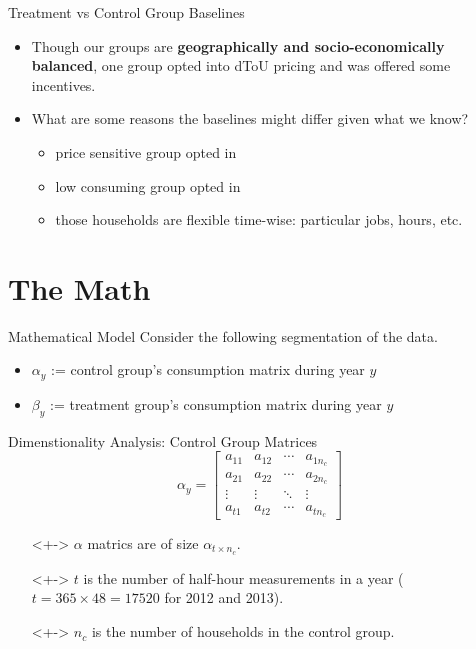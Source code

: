 \documentclass{beamer}
\begin{document}
\begin{frame}{Treatment vs Control Group Baselines}
  \begin{itemize}
    \item<+-> Though our groups are \textbf{geographically and socio-economically balanced}, one group opted into dToU pricing and was offered some incentives.
    \item<+-> What are some reasons the baselines might differ given what we know?
    \begin{itemize}
      \item<+-> price sensitive group opted in
      \item<+-> low consuming group opted in
      \item<+-> those households are flexible time-wise: particular jobs, hours, etc.
    \end{itemize}
  \end{itemize}
\end{frame}

\section{The Math}

\begin{frame}{Mathematical Model}
  Consider the following segmentation of the data.
  \begin{itemize}
    \item $\alpha_y$ := control group's consumption matrix during year $y$
    \item $\beta_y$ := treatment group's consumption matrix during year $y$
  \end{itemize}
\end{frame}

\begin{frame}{Dimenstionality Analysis: Control Group Matrices}
  $$
  \alpha_y = \left[\begin{array}{cccc}
  a_{11} & a_{12} & \cdots & a_{1 n_c} \\
  a_{21} & a_{22} & \cdots & a_{2 n_c} \\
  \vdots & \vdots & \ddots & \vdots \\
  a_{t 1} & a_{t 2} & \cdots & a_{t n_c}
  \end{array}\right]
  $$
  \begin{itemize}
  \item[]<+-> $\alpha$ matrics are of size $\alpha_{t \times n_c}$.
  \item[]<+-> $t$ is the number of half-hour measurements in a year ($t = 365 \times 48 = 17520$ for 2012 and 2013).
  \item[]<+-> $n_c$ is the number of households in the control group. 
  \end{itemize}
\end{frame}
\end{document}
